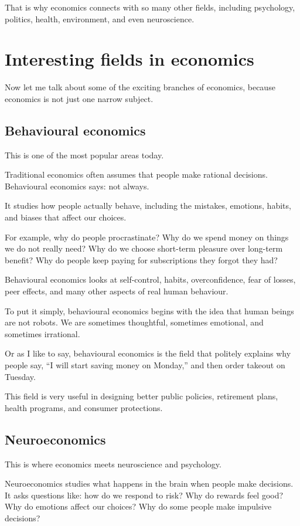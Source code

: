 \documentclass[12pt]{article}
\begin{document}
That is why economics connects with so many other fields, including psychology, politics, health, environment, and even neuroscience.

\section*{Interesting fields in economics}

Now let me talk about some of the exciting branches of economics, because economics is not just one narrow subject.

\subsection*{Behavioural economics}

This is one of the most popular areas today.

Traditional economics often assumes that people make rational decisions. Behavioural economics says: not always.

It studies how people actually behave, including the mistakes, emotions, habits, and biases that affect our choices.

For example, why do people procrastinate? Why do we spend money on things we do not really need? Why do we choose short-term pleasure over long-term benefit? Why do people keep paying for subscriptions they forgot they had?

Behavioural economics looks at self-control, habits, overconfidence, fear of losses, peer effects, and many other aspects of real human behaviour.

To put it simply, behavioural economics begins with the idea that human beings are not robots. We are sometimes thoughtful, sometimes emotional, and sometimes irrational.

Or as I like to say, behavioural economics is the field that politely explains why people say, ``I will start saving money on Monday,'' and then order takeout on Tuesday.

This field is very useful in designing better public policies, retirement plans, health programs, and consumer protections.

\subsection*{Neuroeconomics}

This is where economics meets neuroscience and psychology.

Neuroeconomics studies what happens in the brain when people make decisions. It asks questions like: how do we respond to risk? Why do rewards feel good? Why do emotions affect our choices? Why do some people make impulsive decisions?
\end{document}
